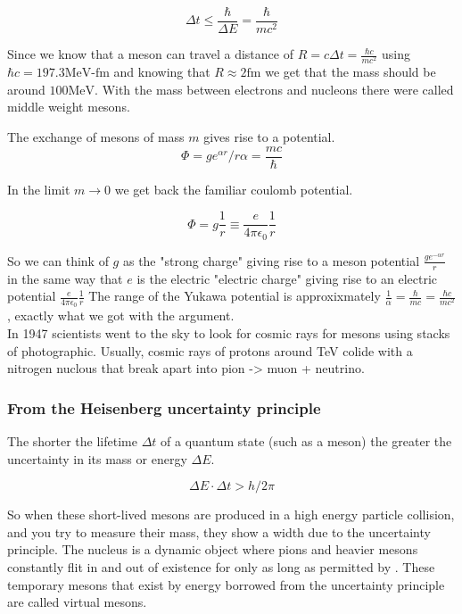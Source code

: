 \documentclass[english, 11pt]{article}
\begin{document}
      \[ \Delta t \le \frac{\hbar}{\Delta E} = \frac{\hbar}{mc^2}\]

      Since we know that a meson can travel a distance of $R = c\Delta t = \frac{\hbar c}{mc^2}$ using $\hbar c = 197.3 \text{MeV-fm}$ and knowing that $R \approx 2 \text{fm}$ we get that the mass should be around $100 \text{MeV}$. With the mass between electrons and nucleons there were called middle weight mesons.

      \begin{defn}\label{yp}
        The exchange of mesons of mass $m$ gives rise to a potential.
        \[ \Phi = ge^{\alpha r}/r \alpha = \frac{mc}{\hbar} \]
      \end{defn}

      In the limit $m\rightarrow0$ we get back the familiar coulomb potential.

      \[ \Phi = g \frac{1}{r} \equiv \frac{e}{4\pi\epsilon_0}\frac{1}{r}\]

      So we can think of $g$ as the "strong charge" giving rise to a meson potential $\frac{ge^{-\alpha r}}{r}$ in the same way that $e$ is the electric "electric charge" giving rise to an electric potential $\frac{e}{4\pi\epsilon_0}\frac{1}{r}$ The range of the Yukawa potential is approxixmately $\frac{1}{\alpha} = \frac{\hbar}{mc} = \frac{\hbar c}{mc^2}$, exactly what we got with the  argument.\\
      In 1947 scientists went to the sky to look for cosmic rays for mesons using stacks of photographic. Usually, cosmic rays of protons around TeV colide with a nitrogen nuclous that break apart into pion -> muon + neutrino. 

      \subsubsection{From the Heisenberg uncertainty principle}
       The shorter the lifetime $\Delta t$ of a quantum state (such as a meson) the greater the uncertainty in its mass or energy $\Delta E$.

        \[ \Delta E \cdot \Delta t > h/2\pi\]

        So when these short-lived mesons are produced in a high energy particle collision, and you try to measure their mass, they show a width due to the uncertainty principle.
        The nucleus is a dynamic object where pions and heavier mesons constantly flit in and out of existence for only as long as permitted by . These temporary mesons that exist by energy borrowed from the uncertainty principle are called virtual mesons.
      
\end{document}
